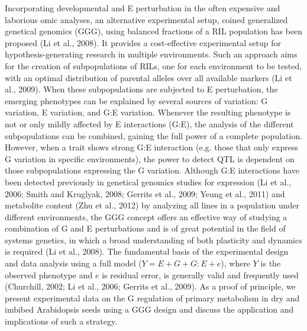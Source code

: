 Incorporating developmental and E  perturbation in the often expensive and laborious omic analyses, an 
alternative experimental setup, coined generalized genetical genomics (GGG), using balanced fractions 
of a RIL population has been proposed (Li et al., 2008). It provides a cost-effective experimental setup 
for hypothesis-generating research in multiple environments. Such an approach aims for the creation of 
subpopulations of RILs, one for each environment to be tested, with an optimal distribution of parental 
alleles over all available markers (Li et al., 2009). When these subpopulations are subjected to E 
perturbation, the emerging phenotypes can be explained by several sources of variation: G variation, 
E variation, and G:E variation. Whenever the resulting phenotype is not or only mildly affected by E 
interactions (G:E), the analysis of the different subpopulations can be combined, gaining the full power 
of a complete population. However, when a trait shows strong G:E interaction (e.g. those that only express 
G variation in specific environments), the power to detect QTL is dependent on those subpopulations 
expressing the G variation. Although G:E interactions have been detected previously in genetical 
genomics studies for expression (Li et al., 2006; Smith and Kruglyak, 2008; Gerrits et al., 2009; 
Yeung et al., 2011) and metabolite content (Zhu et al., 2012) by analyzing all lines in a population 
under different environments, the GGG concept offers an effective way of studying a combination of G 
and E perturbations and is of great potential in the field of systems genetics, in which a broad 
understanding of both plasticity and dynamics is required (Li et al., 2008). The fundamental basis 
of the experimental design and data analysis using a full model ($Y = E + G + G:E + e$), where 
$Y$ is the observed phenotype and $e$ is residual error, is generally valid and frequently used 
(Churchill, 2002; Li et al., 2006; Gerrits et al., 2009). As a proof of principle, we present 
experimental data on the G regulation of primary metabolism in dry and imbibed Arabidopsis seeds 
using a GGG design and discuss the application and implications of such a strategy.

